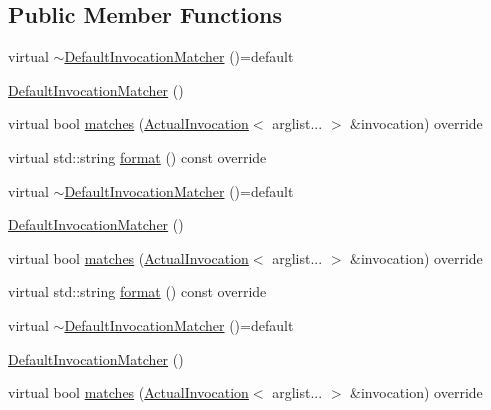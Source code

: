 \subsection*{Public Member Functions}
\begin{DoxyCompactItemize}
\item 
virtual \mbox{\hyperlink{structfakeit_1_1DefaultInvocationMatcher_afa983748ccd4ec5a8293d2621bdc0b76}{$\sim$\+Default\+Invocation\+Matcher}} ()=default
\item 
\mbox{\hyperlink{structfakeit_1_1DefaultInvocationMatcher_ae7aacc110f471b0278cdea99d3e0d287}{Default\+Invocation\+Matcher}} ()
\item 
virtual bool \mbox{\hyperlink{structfakeit_1_1DefaultInvocationMatcher_a6eec95726a684a4dc2498b00e68e8166}{matches}} (\mbox{\hyperlink{structfakeit_1_1ActualInvocation}{Actual\+Invocation}}$<$ arglist... $>$ \&invocation) override
\item 
virtual std\+::string \mbox{\hyperlink{structfakeit_1_1DefaultInvocationMatcher_a056fc7516e51e5eb15831359cb376fef}{format}} () const override
\item 
virtual \mbox{\hyperlink{structfakeit_1_1DefaultInvocationMatcher_afa983748ccd4ec5a8293d2621bdc0b76}{$\sim$\+Default\+Invocation\+Matcher}} ()=default
\item 
\mbox{\hyperlink{structfakeit_1_1DefaultInvocationMatcher_ae7aacc110f471b0278cdea99d3e0d287}{Default\+Invocation\+Matcher}} ()
\item 
virtual bool \mbox{\hyperlink{structfakeit_1_1DefaultInvocationMatcher_a6eec95726a684a4dc2498b00e68e8166}{matches}} (\mbox{\hyperlink{structfakeit_1_1ActualInvocation}{Actual\+Invocation}}$<$ arglist... $>$ \&invocation) override
\item 
virtual std\+::string \mbox{\hyperlink{structfakeit_1_1DefaultInvocationMatcher_a056fc7516e51e5eb15831359cb376fef}{format}} () const override
\item 
virtual \mbox{\hyperlink{structfakeit_1_1DefaultInvocationMatcher_afa983748ccd4ec5a8293d2621bdc0b76}{$\sim$\+Default\+Invocation\+Matcher}} ()=default
\item 
\mbox{\hyperlink{structfakeit_1_1DefaultInvocationMatcher_ae7aacc110f471b0278cdea99d3e0d287}{Default\+Invocation\+Matcher}} ()
\item 
virtual bool \mbox{\hyperlink{structfakeit_1_1DefaultInvocationMatcher_a6eec95726a684a4dc2498b00e68e8166}{matches}} (\mbox{\hyperlink{structfakeit_1_1ActualInvocation}{Actual\+Invocation}}$<$ arglist... $>$ \&invocation) override
\item 

\end{DoxyCompactItemize}

